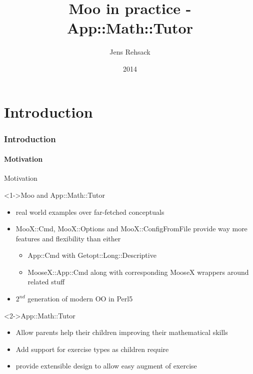 \documentclass[ngerman,xcolor={table,dvipsnames},smaller,compress,hyperref={bookmarks,colorlinks}]{beamer}
\title{Moo in practice - App::Math::Tutor}
\author{Jens Rehsack}
\institute[Niederrhein.PM]{Niederrhein Perl Mongers}
\date{2014}
\begin{document}


\frame{\maketitle}

\part{Introduction}

\section{Introduction}

\subsection{Motivation}

\begin{frame}[t,fragile]{Motivation}

\begin{block}<1->{Moo and App::Math::Tutor}
\begin{itemize}
\item real world examples over far-fetched conceptuals
\item MooX::Cmd, MooX::Options and MooX::ConfigFromFile provide way more features and flexibility than either
      \begin{itemize}
      \item App::Cmd with Getopt::Long::Descriptive
      \item MooseX::App::Cmd along with corresponding MooseX wrappers around related stuff
      \end{itemize}
\item $ 2^{nd} $ generation of modern OO in Perl5
\end{itemize}
\end{block}

\begin{block}<2->{App::Math::Tutor}
\begin{itemize}
\item Allow parents help their children improving their mathematical skills
\item Add support for exercise types as children require
\item provide extensible design to allow easy augment of exercise
\end{itemize}
\end{block}

\end{frame}
\end{document}
